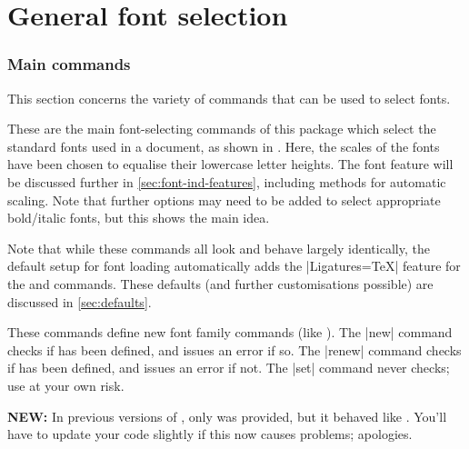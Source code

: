 \documentclass[a4paper]{l3doc}
\begin{document}
\part{General font selection}

\section{Main commands}
\label{sec:main-cmd}

This section concerns the variety of commands that can be used to select
fonts.

\bigskip
{}

These are the main font-selecting commands of this package which select the standard fonts used in a document, as shown in .
Here, the scales of the fonts have been chosen to equalise their
lowercase letter heights. The  font feature will be discussed
further in \vref{sec:font-ind-features}, including methods for automatic
scaling.
Note that further options may need to be added to select appropriate bold/italic fonts,
but this shows the main idea.

Note that while these commands all look and behave largely identically, the default setup for font loading automatically adds the |Ligatures=TeX| feature for the  and  commands.
These defaults (and further customisations possible) are discussed in \vref{sec:defaults}.

\bigskip
{}

These commands define new font family commands (like ).
The |new| command checks if  has been defined, and issues an error if so.
The |renew| command checks if  has been defined, and issues an error if not.
The |set| command never checks; use at your own risk.

\textbf{NEW:} In previous versions of , only  was provided, but it behaved
like . You'll have to update your code slightly if this now causes problems; apologies.
\end{document}
